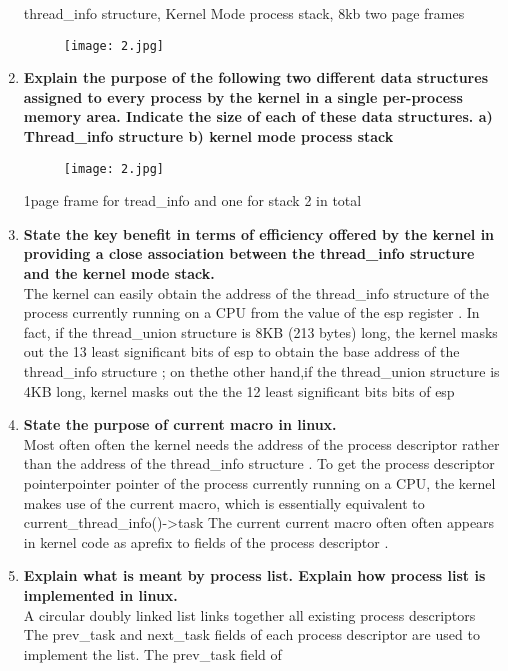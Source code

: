 \documentclass[a4paper,12pt]{article}
\begin{document}
\begin{flushleft}
\begin{enumerate}
{\color{red}thread\_info structure, Kernel Mode process stack, 8kb two page frames}
\begin{figure}[H]
 \centering
  \texttt{[image: 2.jpg]}
  \label{fig:2}
\end{figure}
\item \textbf{ Explain the purpose of the following two different data structures assigned to every process by the kernel in a single per-process memory area. Indicate the size of each of these data structures.
a) Thread\_info structure b) kernel mode process stack\\}
\begin{figure}[H]
 \centering
  \texttt{[image: 2.jpg]}
  \label{fig:3}
\end{figure}
{\color{red}1page frame for tread\_info and one for stack 2 in total}
\item \textbf{ State the key benefit in terms of efficiency offered by the kernel in providing a close association between the thread\_info structure and the kernel mode stack.\\}
{\color{red} The kernel  can  easily obtain the address  of the thread\_info structure of the process currently running  on a CPU from the value of the esp register .
 In fact, if the thread\_union structure is 8KB (213 bytes) long, the kernel  masks out the 13  least significant bits of esp to obtain the base address of the thread\_info structure ;
 on thethe other hand,if the thread\_union   structure is 4KB long,  kernel masks out the the 12 least significant bits bits of esp }
\item \textbf{ State the purpose of current macro in linux.\\}
{\color{red}
 Most often often the  kernel needs the address of the process descriptor rather than the address  of the thread\_info structure .
 To get the process descriptor pointerpointer pointer of the process  currently running on a CPU, the kernel  makes use of the current  macro,  which is essentially equivalent  to current\_thread\_info()-\textgreater task
The current current macro often often appears  in  kernel code as aprefix to fields  of the process descriptor .}
\item \textbf{ Explain what is meant by process list. Explain how process list is implemented in linux.\\}
{\color{red}A circular doubly linked list  links together all existing process descriptors\\The prev\_task and next\_task fields of each process
descriptor are used to implement the list.  The prev\_task field of
}
\end{enumerate}
\end{flushleft}
\end{document}
